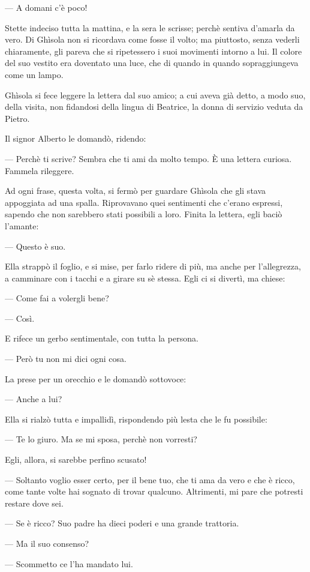 — A domani c’è poco!

Stette indeciso tutta la mattina, e la sera le scrisse; perchè sentiva d’amarla da vero. Di Ghìsola non si ricordava come fosse il volto; ma piuttosto, senza vederli chiaramente, gli pareva che si ripetessero i suoi movimenti intorno a lui. Il colore del suo vestito era doventato una luce, che di quando in quando sopraggiungeva come un lampo.

Ghìsola si fece leggere la lettera dal suo amico; a cui aveva già detto, a modo suo, della visita, non fidandosi della lingua di Beatrice, la donna di servizio veduta da Pietro.

Il signor Alberto le domandò, ridendo:

— Perchè ti scrive? Sembra che ti ami da molto tempo. È una lettera curiosa. Fammela rileggere.

Ad ogni frase, questa volta, si fermò per guardare Ghìsola che gli stava appoggiata ad una spalla. Riprovavano quei sentimenti che c’erano espressi, sapendo che non sarebbero stati possibili a loro. Finita la lettera, egli baciò l’amante:

— Questo è suo.

Ella strappò il foglio, e si mise, per farlo ridere di più, ma anche per l’allegrezza, a camminare con i tacchi e a girare su sè stessa. Egli ci si divertì, ma chiese:

— Come fai a volergli bene?

— Così.

E rifece un gerbo sentimentale, con tutta la persona.

— Però tu non mi dici ogni cosa.

La prese per un orecchio e le domandò sottovoce:

— Anche a lui?

Ella si rialzò tutta e impallidì, rispondendo più lesta che le fu possibile:

— Te lo giuro. Ma se mi sposa, perchè non vorresti?

Egli, allora, si sarebbe perfino scusato!

— Soltanto voglio esser certo, per il bene tuo, che ti ama da vero e che è ricco, come tante volte hai sognato di trovar qualcuno. Altrimenti, mi pare che potresti restare dove sei.

— Se è ricco? Suo padre ha dieci poderi e una grande trattoria.

— Ma il suo consenso?

— Scommetto ce l’ha mandato lui.

